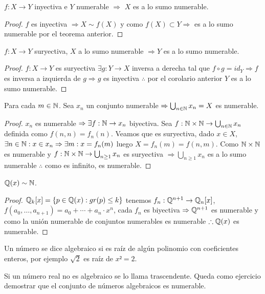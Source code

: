 \begin{corollary}
    \(f: X \to Y\) inyectiva e \(Y\) numerable \(\Rightarrow \) \(X\) es a lo sumo numerable.
    \begin{proof}
        \(f\) es inyectiva \(\Rightarrow X \sim f(X)\) y como \(f(X) \subset Y \Rightarrow \) es a lo sumo numerable por el teorema anterior.
    \end{proof}
\end{corollary}

\begin{theorem}
    \(f: X \to Y\) suryectiva, \(X\) a lo sumo numerable \(\Rightarrow Y\) es a lo sumo numerable.
    \begin{proof}
        \(f: X \to Y\) es suryectiva \(\exists g: Y \to X\) inversa a derecha tal que \(f \circ g = id_Y \Rightarrow f\) es inversa a izquierda de \(g \Rightarrow g\) es inyectiva \(\therefore \) por el corolario anterior \(Y\) es a lo sumo numerable.
    \end{proof}
\end{theorem}

\begin{theorem}
    Para cada \(m \in \mathbb{N} \). Sea \(x_n\) un conjunto numerable \(\Rightarrow \bigcup_{n \in \mathbb{N}}x_n = X\) es numerable.
    \begin{proof}
        \(x_n\) es numerable \(\Rightarrow \exists f:\mathbb{N} \to x_n\) biyectiva. Sea \(f:\mathbb{N} \times \mathbb{N} \to \bigcup_{n \in \mathbb{N}} x_n\) definida como \(f(n, n) = f_n(n)\). Veamos que es suryectiva, dado \(x \in X\), \(\exists n \in \mathbb{N}:x \in x_n \Rightarrow \exists m:x=f_n(m)\) luego \(X=f_n(m) = f(n, m)\). Como \(\mathbb{N} \times \mathbb{N} \) es numerable y \(f: \mathbb{N} \times \mathbb{N} \to \bigcup_{n \geq 1}{x_n} \) es suryectiva \(\Rightarrow \bigcup_{n \geq 1}x_n\) es a lo sumo numerable \(\therefore \) como es infinito, es numerable.
    \end{proof}
\end{theorem}

\begin{eg}
    \(\mathbb{Q}(x) \sim \mathbb{N} \).
    \begin{proof}
        \(\mathbb{Q}_k[x] = \{ p \in \mathbb{Q}(x) : gr(p) \leq k \} \) tenemos \(f_n : \mathbb{Q}^{n+1} \to \mathbb{Q}_n[x]\), \(f(a_0, \ldots, a_{n+1}) = a_0 + \cdots + a_n \cdot x^n\), cada \(f_n\) es biyectiva \(\Rightarrow \mathbb{Q}^{n+1} \) es numerable y como la unión numerable de conjuntos numerables es numerable \(\therefore \mathbb{Q}(x)\) es numerable.
    \end{proof}
\end{eg}

\begin{definition}
    Un número se dice algebraico si es raíz de algún polinomio con coeficientes enteros, por ejemplo \(\sqrt{2} \) es raíz de \(x² = 2\).
\end{definition}

\begin{definition}
    Si un número real no es algebraico se lo llama trascendente. Queda como ejercicio demostrar que el conjunto de números algebraicos es numerable.
\end{definition}